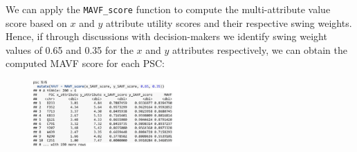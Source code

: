 \documentclass[twocolumn]{svjour3}       %
\begin{document}
We can apply the \texttt{MAVF\_score} function to compute the multi-attribute value score based on $x$ and $y$ attribute utility scores and their respective swing weights. Hence, if through discussions with decision-makers we identify swing weight values of 0.65 and 0.35 for the $x$ and $y$ attributes respectively, we can obtain the computed MAVF score for each PSC:

\begin{figure}[!htb]
  \includegraphics[width=0.5\textwidth]{code11.png}
\end{figure}
\end{document}
